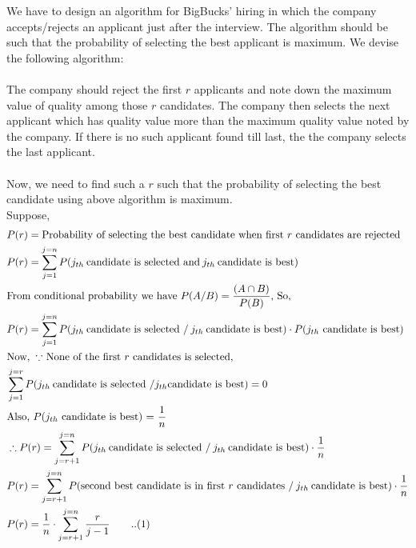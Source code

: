 \documentclass[12pt]{article}
\begin{document}
    \begin{solution}
        We have to design an algorithm for BigBucks' hiring in which the company accepts/rejects an applicant just after the interview. The algorithm should be such that the probability of selecting the best applicant is maximum.
        We devise the following algorithm:\\
        \\
        The company should reject the first $r$ applicants and note down the maximum value of quality among those $r$ candidates. The company then selects the next applicant which has quality value more than the maximum quality value noted by the company. If there is no such applicant found till last, the  the company selects the last applicant.\\
        \\
        Now, we need to find such a $r$ such that the probability of selecting the best candidate using above algorithm is maximum.\\
        Suppose,
        \begin{align*}
        &P(r)=\text{Probability of selecting the best candidate when first $r$ candidates are rejected}\\
        &P(r)=\sum_{j=1}^{j=n} P(j_{th}\:\text{candidate is selected and}\: j_{th}\: \text{candidate is best)}\\
        & \text{From conditional probability we have $P(A/B)=\frac{(A \cap B)}{P(B)}$, So,}\\
        &P(r)= \sum_{j=1}^{j=n} P(j_{th}\:\text{candidate is selected /} \:j_{th}\: \text{candidate is best)} \cdot P(\text{$j_{th}$ candidate is best)}\\
        & \text{Now, \:$\because$ None of the first $r$ candidates is selected,}\\
        & \sum_{j=1}^{j=r} P(j_{th}\:\text{candidate is selected /} j_{th} \text{candidate is best)}=0  \\ 
        & \text{Also, $P$(\text{$j_{th}$ candidate is best)} = $\frac{1}{n}$}\\
        &\therefore P(r)= \sum_{j=r+1}^{j=n} P(j_{th}\:\text{candidate is selected /} \:j_{th}\: \text{candidate is best)} \cdot \frac{1}{n}\\
        &P(r)= \sum_{j=r+1}^{j=n} P(\text{second best candidate is in first $r$ candidates /} \:j_{th}\: \text{candidate is best)} \cdot \frac{1}{n}\\
        &P(r)= \frac{1}{n} \cdot \sum_{j=r+1}^{j=n} \frac{r}{j-1}\quad\quad..(1)
        \end{align*}

\end{solution}
\end{document}
